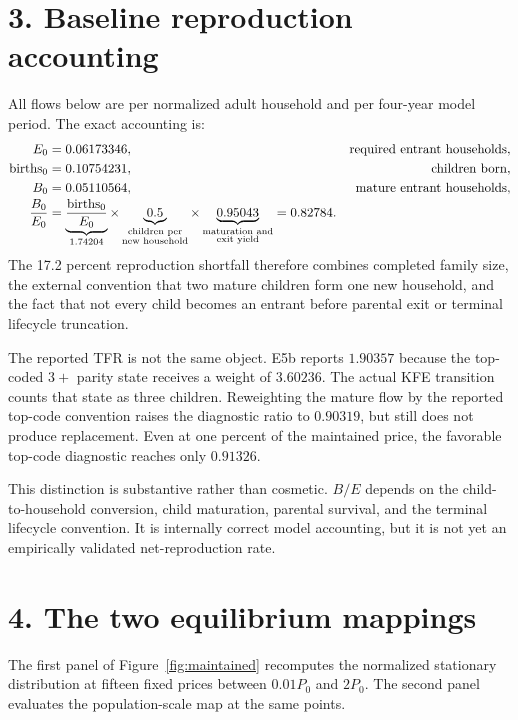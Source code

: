 \documentclass[11pt]{article}
\begin{document}
\section*{3. Baseline reproduction accounting}

All flows below are per normalized adult household and per four-year model
period.  The exact accounting is:
\begin{align}
 E_0&=0.06173346,
 &\text{required entrant households},\notag\\
 \text{births}_0&=0.10754231,
 &\text{children born},\notag\\
 B_0&=0.05110564,
 &\text{mature entrant households},\notag\\[-2pt]
 \frac{B_0}{E_0}
 &=
 \underbrace{\frac{\text{births}_0}{E_0}}_{1.74204}
 \times
 \underbrace{0.5}_{\substack{\text{children per}\\\text{new household}}}
 \times
 \underbrace{0.95043}_{\substack{\text{maturation and}\\\text{exit yield}}}
 =0.82784.
 \label{eq:accounting}
\end{align}
The 17.2 percent reproduction shortfall therefore combines completed family
size, the external convention that two mature children form one new household,
and the fact that not every child becomes an entrant before parental exit or
terminal lifecycle truncation.

The reported TFR is not the same object.  E5b reports $1.90357$ because the
top-coded $3+$ parity state receives a weight of $3.60236$.  The actual KFE
transition counts that state as three children.  Reweighting the mature flow by
the reported top-code convention raises the diagnostic ratio to $0.90319$, but
still does not produce replacement.  Even at one percent of the maintained
price, the favorable top-code diagnostic reaches only $0.91326$.

This distinction is substantive rather than cosmetic.  $B/E$ depends on the
child-to-household conversion, child maturation, parental survival, and the
terminal lifecycle convention.  It is internally correct model accounting, but
it is not yet an empirically validated net-reproduction rate.

\section*{4. The two equilibrium mappings}

The first panel of Figure~\ref{fig:maintained} recomputes the normalized
stationary distribution at fifteen fixed prices between $0.01P_0$ and $2P_0$.
The second panel evaluates the population-scale map at the same points.
\end{document}
